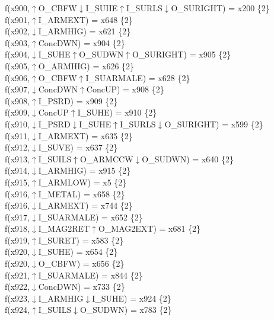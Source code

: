 f(x900,$\uparrow$O\_CBFW$\downarrow$I\_SUHE$\uparrow$I\_SURLS$\downarrow$O\_SURIGHT) = x200 \{2\} \\  
f(x901,$\uparrow$I\_ARMEXT) = x648 \{2\} \\  
f(x902,$\downarrow$I\_ARMHIG) = x621 \{2\} \\  
f(x903,$\uparrow$ConcDWN) = x904 \{2\} \\  
f(x904,$\downarrow$I\_SUHE$\uparrow$O\_SUDWN$\uparrow$O\_SURIGHT) = x905 \{2\} \\  
f(x905,$\uparrow$O\_ARMHIG) = x626 \{2\} \\  
f(x906,$\uparrow$O\_CBFW$\uparrow$I\_SUARMALE) = x628 \{2\} \\  
f(x907,$\downarrow$ConcDWN$\uparrow$ConcUP) = x908 \{2\} \\  
f(x908,$\uparrow$I\_PSRD) = x909 \{2\} \\  
f(x909,$\downarrow$ConcUP$\uparrow$I\_SUHE) = x910 \{2\} \\  
f(x910,$\downarrow$I\_PSRD$\downarrow$I\_SUHE$\uparrow$I\_SURLS$\downarrow$O\_SURIGHT) = x599 \{2\} \\  
f(x911,$\downarrow$I\_ARMEXT) = x635 \{2\} \\  
f(x912,$\downarrow$I\_SUVE) = x637 \{2\} \\  
f(x913,$\uparrow$I\_SUILS$\uparrow$O\_ARMCCW$\downarrow$O\_SUDWN) = x640 \{2\} \\  
f(x914,$\downarrow$I\_ARMHIG) = x915 \{2\} \\  
f(x915,$\uparrow$I\_ARMLOW) = x5 \{2\} \\  
f(x916,$\uparrow$I\_METAL) = x658 \{2\} \\  
f(x916,$\downarrow$I\_ARMEXT) = x744 \{2\} \\  
f(x917,$\downarrow$I\_SUARMALE) = x652 \{2\} \\  
f(x918,$\downarrow$I\_MAG2RET$\uparrow$O\_MAG2EXT) = x681 \{2\} \\  
f(x919,$\uparrow$I\_SURET) = x583 \{2\} \\  
f(x920,$\downarrow$I\_SUHE) = x654 \{2\} \\  
f(x920,$\downarrow$O\_CBFW) = x656 \{2\} \\  
f(x921,$\uparrow$I\_SUARMALE) = x844 \{2\} \\  
f(x922,$\downarrow$ConcDWN) = x733 \{2\} \\  
f(x923,$\downarrow$I\_ARMHIG$\downarrow$I\_SUHE) = x924 \{2\} \\  
f(x924,$\uparrow$I\_SUILS$\downarrow$O\_SUDWN) = x783 \{2\} \\  
